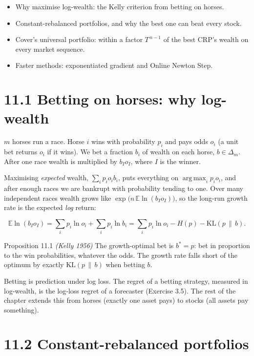 \documentclass[11pt,a4paper,openany]{book}
\newcommand{\E}{\mathbb{E}}
\newcommand{\KL}{\mathrm{KL}}
\DeclareMathOperator*{\argmax}{arg\,max}
\newcommand{\simplex}{\Delta}
\begin{document}
\begin{goals}
\begin{itemize}
\item Why maximise log-wealth: the Kelly criterion from betting on horses.
\item Constant-rebalanced portfolios, and why the best one can beat every stock.
\item Cover's universal portfolio: within a factor $T^{\,n-1}$ of the best CRP's wealth on every market sequence.
\item Faster methods: exponentiated gradient and Online Newton Step.
\end{itemize}
\end{goals}

\section*{11.1 Betting on horses: why log-wealth}\label{ch11-kelly}

$m$ horses run a race. Horse $i$ wins with probability $p_i$ and pays odds $o_i$ (a unit bet returns $o_i$ if it wins). We bet a fraction $b_i$ of wealth on each horse, $b\in\simplex_m$. After one race wealth is multiplied by $b_Io_I$, where $I$ is the winner.

Maximising \emph{expected} wealth, $\sum_ip_io_ib_i$, puts everything on $\argmax_ip_io_i$, and after enough races we are bankrupt with probability tending to one. Over many independent races wealth grows like $\exp\big(n\,\E\ln(b_Io_I)\big)$, so the long-run growth rate is the expected \emph{log} return:

\[\E\ln(b_Io_I)=\sum_ip_i\ln o_i+\sum_ip_i\ln b_i=\sum_ip_i\ln o_i-H(p)-\KL(p\,\|\,b).\]

\begin{bthm}{Proposition 11.1 \emph{(Kelly 1956)}}
The growth-optimal bet is $b^*=p$: bet in proportion to the win probabilities, whatever the odds. The growth rate falls short of the optimum by exactly $\KL(p\,\|\,b)$ when betting $b$.
\end{bthm}

Betting is prediction under log loss. The regret of a betting strategy, measured in log-wealth, is the log-loss regret of a forecaster (Exercise 3.5). The rest of the chapter extends this from horses (exactly one asset pays) to stocks (all assets pay something).

\section*{11.2 Constant-rebalanced portfolios}\label{ch11-crp}
\end{document}
